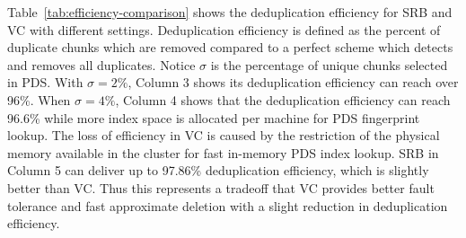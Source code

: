 Table~\ref{tab:efficiency-comparison} shows the deduplication efficiency for SRB and VC with different 
settings.
Deduplication efficiency is defined as the percent of duplicate chunks which are removed
compared to a perfect scheme which detects and removes  all duplicates. 
Notice $\sigma$ is the percentage of unique chunks selected in PDS.
With $\sigma =2\%$, Column 3 shows its 
deduplication efficiency can 
reach over 96\%.
When $\sigma=4\%$, Column 4 shows that the deduplication efficiency can reach 96.6\% while 
more index space is allocated  per machine for  PDS fingerprint lookup.
The loss of efficiency in VC is caused by the restriction of the physical memory available
in the cluster for fast in-memory PDS index lookup. 
SRB in Column 5 can deliver up to 97.86\% deduplication efficiency, which is slightly better than VC.
Thus this represents a tradeoff that VC provides better fault tolerance and fast approximate deletion
with a slight reduction in deduplication efficiency.


